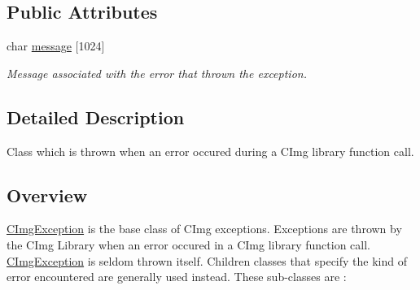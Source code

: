\subsection*{Public Attributes}
\begin{DoxyCompactItemize}
\item 
\hypertarget{structcimg__library_1_1_c_img_exception_a0d6ea22499e9e0fd52c5995ecb99cba2}{char \hyperlink{structcimg__library_1_1_c_img_exception_a0d6ea22499e9e0fd52c5995ecb99cba2}{message} \mbox{[}1024\mbox{]}}\label{structcimg__library_1_1_c_img_exception_a0d6ea22499e9e0fd52c5995ecb99cba2}

\begin{DoxyCompactList}\small\item\em Message associated with the error that thrown the exception. \end{DoxyCompactList}\end{DoxyCompactItemize}


\subsection{Detailed Description}
Class which is thrown when an error occured during a C\-Img library function call. 

\hypertarget{structcimg__library_1_1_c_img_exception_ex1}{}\subsection{Overview}\label{structcimg__library_1_1_c_img_exception_ex1}
\hyperlink{structcimg__library_1_1_c_img_exception}{C\-Img\-Exception} is the base class of C\-Img exceptions. Exceptions are thrown by the C\-Img Library when an error occured in a C\-Img library function call. \hyperlink{structcimg__library_1_1_c_img_exception}{C\-Img\-Exception} is seldom thrown itself. Children classes that specify the kind of error encountered are generally used instead. These sub-\/classes are \-:


